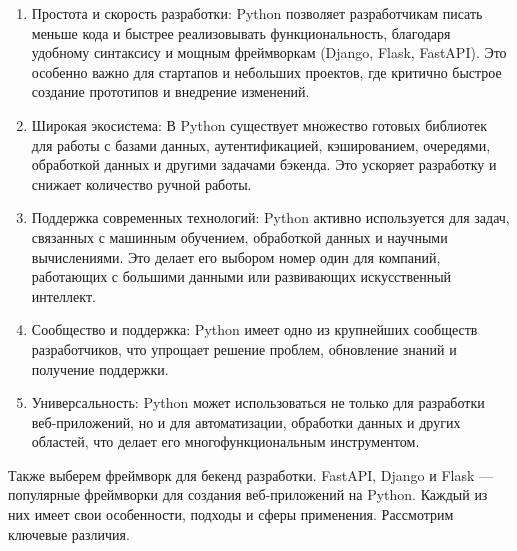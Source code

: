 \begin{enumerate}
	\item Простота и скорость разработки: Python позволяет разработчикам писать меньше кода и быстрее реализовывать функциональность, благодаря удобному синтаксису и мощным фреймворкам (Django, Flask, FastAPI). Это особенно важно для стартапов и небольших проектов, где критично быстрое создание прототипов и внедрение изменений.
	\item Широкая экосистема: В Python существует множество готовых библиотек для работы с базами данных, аутентификацией, кэшированием, очередями, обработкой данных и другими задачами бэкенда. Это ускоряет разработку и снижает количество ручной работы.
	\item Поддержка современных технологий: Python активно используется для задач, связанных с машинным обучением, обработкой данных и научными вычислениями. Это делает его выбором номер один для компаний, работающих с большими данными или развивающих искусственный интеллект.
	\item Сообщество и поддержка: Python имеет одно из крупнейших сообществ разработчиков, что упрощает решение проблем, обновление знаний и получение поддержки.
	\item Универсальность: Python может использоваться не только для разработки веб-приложений, но и для автоматизации, обработки данных и других областей, что делает его многофункциональным инструментом.
\end{enumerate}

Также выберем фреймворк для бекенд разработки. FastAPI, Django и Flask — популярные фреймворки для создания веб-приложений на Python. Каждый из них имеет свои особенности, подходы и сферы применения. Рассмотрим ключевые различия.

